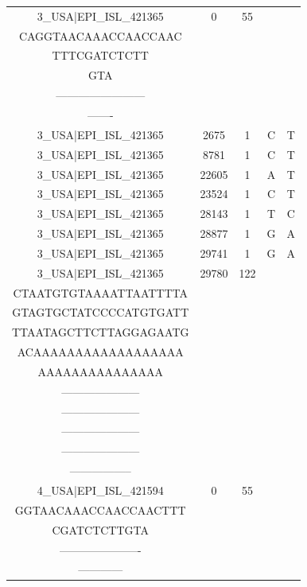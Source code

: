 \documentclass[a4paper,10pt]{article}
\begin{document}
\begin{longtable}{@{}ccccc@{}}
3\_USA|EPI\_ISL\_421365 & 0 & 55 & \begin{tabular}[c]{@{}c@{}}ATTAAAGGTTTATACCTTCC\\CAGGTAACAAACCAACCAAC\\TTTCGATCTCTT\\ GTA\end{tabular} & \begin{tabular}[c]{@{}c@{}}------------------------\\ ------------------------\\ -------\end{tabular} \\* \midrule
3\_USA|EPI\_ISL\_421365 & 2675 & 1 & C & T \\* \midrule
3\_USA|EPI\_ISL\_421365 & 8781 & 1 & C & T \\* \midrule
3\_USA|EPI\_ISL\_421365 & 22605 & 1 & A & T \\* \midrule
3\_USA|EPI\_ISL\_421365 & 23524 & 1 & C & T \\* \midrule
3\_USA|EPI\_ISL\_421365 & 28143 & 1 & T & C \\* \midrule
3\_USA|EPI\_ISL\_421365 & 28877 & 1 & G & A \\* \midrule
3\_USA|EPI\_ISL\_421365 & 29741 & 1 & G & A \\* \midrule
3\_USA|EPI\_ISL\_421365 & 29780 & 122 & \begin{tabular}[c]{@{}c@{}}AGCTGCCTATATGGAAGAGCC\\ CTAATGTGTAAAATTAATTTTA\\ GTAGTGCTATCCCCATGTGATT\\ TTAATAGCTTCTTAGGAGAATG\\ ACAAAAAAAAAAAAAAAAAA\\ AAAAAAAAAAAAAAA\end{tabular} & \begin{tabular}[c]{@{}c@{}}---------------------\\ ---------------------\\ ---------------------\\ ---------------------\\ ---------------------\\ -----------------\end{tabular} \\* \midrule
4\_USA|EPI\_ISL\_421594 & 0 & 55 & \begin{tabular}[c]{@{}c@{}}ATTAAAGGTTTATACCTTCCCA\\ GGTAACAAACCAACCAACTTT\\ CGATCTCTTGTA\end{tabular} & \begin{tabular}[c]{@{}c@{}}---------------------\\ ----------------------\\ ------------\end{tabular} \\* \midrule

\end{longtable}
\end{document}

